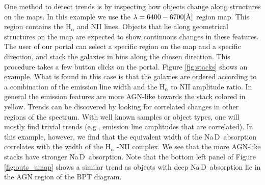 \documentclass[fleqn,usenatbib]{mnras}
\newcommand{\angstrom}{\mbox{\normalfont\AA}}
\def\nad{\mbox{Na\hspace{.5pt}{I}\,D}}
\begin{document}
{One method to detect trends is by inspecting how objects change along structures on the maps.  In this example we use the $\lambda = 6400 - 6700 [\angstrom]$ region map. This region contains the H$_{\alpha}$ and NII lines. Objects that lie along geometrical structures on the map are expected to show continuous changes in these features. The user of our portal can select a specific region on the map and a specific direction, and stack the galaxies in bins along the chosen direction. This procedure takes a few button clicks on the portal. Figure \ref{fig:stacks} shows an example. What is found in this case is that the galaxies are ordered according to a combination of the emission line width and the H$_{\alpha}$ to NII amplitude ratio. In general the emission features are more  AGN-like towards the stack colored in yellow. Trends can be discovered by  looking for correlated changes in other regions of the spectrum. With well known samples or object types, one will mostly find trivial trends (e.g.,  emission line amplitudes that are correlated). In this example, however, we find that the equivalent width of the \nad\ absorption correlates with the width of the H$_{\alpha}$ -NII complex. We see that the more AGN-like stacks  have stronger \nad\ absorption. Note that the bottom left panel of Figure \ref{fig:outs_umap}  shows a similar trend as objects with deep \nad\ absorption lie in the AGN region of the BPT diagram.


}
\end{document}
